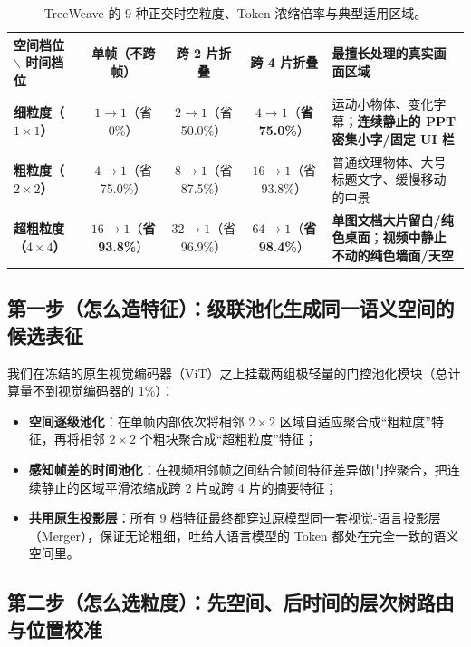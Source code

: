 \documentclass[11pt,a4paper]{ctexart}
\begin{document}
\begin{table}[H]
\centering
\footnotesize
\setlength{\tabcolsep}{6pt}
\caption{TreeWeave 的 9 种正交时空粒度、Token 浓缩倍率与典型适用区域。}
\label{tab:granularities}
\begin{tabularx}{\linewidth}{@{}l c c c >{\raggedright\arraybackslash}X@{}}
\toprule
\textbf{空间档位 $\backslash$ 时间档位} & \textbf{单帧（不跨帧）} & \textbf{跨 2 片折叠} & \textbf{跨 4 片折叠} & \textbf{最擅长处理的真实画面区域} \\
\midrule
\textbf{细粒度（$1{\times}1$）} & $1{\to}1$（省 0\%） & $2{\to}1$（省 50.0\%） & \cellcolor{AmberSoft}$4{\to}1$（\textbf{省 75.0\%}） & 运动小物体、变化字幕；\textbf{连续静止的 PPT 密集小字/固定 UI 栏} \\
\textbf{粗粒度（$2{\times}2$）} & $4{\to}1$（省 75.0\%） & $8{\to}1$（省 87.5\%） & $16{\to}1$（省 93.8\%） & 普通纹理物体、大号标题文字、缓慢移动的中景 \\
\textbf{超粗粒度（$4{\times}4$）} & \cellcolor{TealSoft}$16{\to}1$（\textbf{省 93.8\%}） & $32{\to}1$（省 96.9\%） & \cellcolor{TealSoft}$64{\to}1$（\textbf{省 98.4\%}） & \textbf{单图文档大片留白/纯色桌面}；\textbf{视频中静止不动的纯色墙面/天空} \\
\bottomrule
\end{tabularx}
\end{table}

\subsection{第一步（怎么造特征）：级联池化生成同一语义空间的候选表征}

我们在冻结的原生视觉编码器（ViT）之上挂载两组极轻量的门控池化模块（总计算量不到视觉编码器的 1\%）：
\begin{itemize}[leftmargin=1.5em, itemsep=3pt]
  \item \textbf{空间逐级池化}：在单帧内部依次将相邻 $2{\times}2$ 区域自适应聚合成``粗粒度''特征，再将相邻 $2{\times}2$ 个粗块聚合成``超粗粒度''特征；
  \item \textbf{感知帧差的时间池化}：在视频相邻帧之间结合帧间特征差异做门控聚合，把连续静止的区域平滑浓缩成跨 2 片或跨 4 片的摘要特征；
  \item \textbf{共用原生投影层}：所有 9 档特征最终都穿过原模型同一套视觉-语言投影层（Merger），保证无论粗细，吐给大语言模型的 Token 都处在完全一致的语义空间里。
\end{itemize}

\subsection{第二步（怎么选粒度）：先空间、后时间的层次树路由与位置校准}
\end{document}

